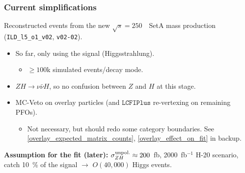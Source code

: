 
\begin{frame}
  \frametitle{Current simplifications}

  Reconstructed events from the new $\sqrt{s} = 250$~\GeV~SetA mass production (\texttt{ILD\_l5\_o1\_v02}, \texttt{v02-02}).
  \begin{itemize}
    \item So far, only using the signal (Higgsstrahlung).
    \begin{itemize}
      \item $\geq 100$k simulated events/decay mode.
     \end{itemize}
    \item $ZH \rightarrow \nu \bar{\nu}H$, so no confusion between $Z$ and $H$ at this stage.
    \item MC-Veto on overlay particles (and $\texttt{LCFIPlus}$ re-vertexing on remaining PFOs).
    \begin{itemize}
      \item Not necessary, but should redo some category boundaries.
            See {\color{llblue}\ref{overlay_expected_matrix_counts}},
            {\color{llblue}\ref{overlay_effect_on_fit}} in backup.
     \end{itemize}
  \end{itemize}
  \textbf{Assumption for the fit (later):}
  $\sigma_{ZH}^{\textnormal{unpol.}} \approx 200$~fb, 2000~fb$^{-1}$ H-20 scenario, \\
  catch 10~\% of the signal $\rightarrow$ $O(40,000)$ Higgs events.

  \end{frame}
